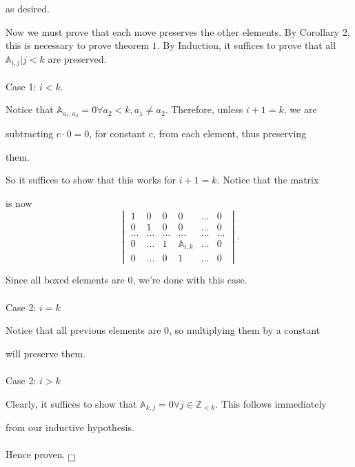 \documentclass{article}
\begin{document}
\par as desired.
\par 
Now we must prove that each move preserves the other elements. By Corollary 2, this is necessary to prove theorem $1$. 
By Induction, it suffices to prove that all $\mathbb{A}_{i,j}|j<k$ are preserved. 
\\ \\ Case 1: $i<k$.
\par Notice that $\mathbb{A}_{a_1, a_2}=0\forall a_2<k, a_1\ne a_2$. Therefore, unless $i+1=k$, we are \par subtracting $c\cdot 0=0$, for constant $c$, from each element, thus preserving \par them. \par So it suffices to show that this works for $i+1=k$. Notice that the matrix \par is now
$$\begin{vmatrix}1 & 0 & 0 & 0 & ... & 0\\ 0 & 1 & 0 & 0 & ...  & 0\\ ... & ... & ... & ... & ... & ...\\ 0 & ... & 1 &\mathbb{A}_{i,k}&...&0\\ \boxed{0} & ... & \boxed{0} & 1 & ... & 0\end{vmatrix}.$$
\par Since all boxed elements are $0$, we're done with this case. 
\\ \\ Case 2: $i=k$
\par Notice that all previous elements are $0$, so multiplying them by a constant \par will preserve them.
\\ \\ Case 2: $i>k$
\par Clearly, it suffices to show that $\mathbb{A}_{k,j}=0\forall j\in\mathbb{Z}_{<k}$. This follows immediately \par from our inductive hypothesis.
\\ \\
Hence proven. $\fbox{}$
\\ \\
\end{document}
